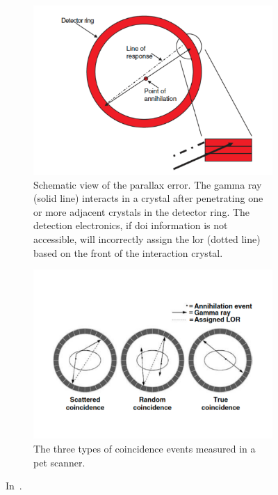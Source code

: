 \begin{figure}[!htbp]
\begin{subfigure}[t]{.49\textwidth}
\centering
\includegraphics[width=0.7\linewidth]{03_GraphicFiles/chapter1_Introduction/PET_parallax.pdf}
\caption{Schematic view of the parallax error. The gamma ray (solid line) interacts in a crystal after penetrating one or more adjacent crystals in the detector ring. The detection electronics, if \gls{doi} information is not accessible, will incorrectly assign the \gls{lor} (dotted line) based on the front of the interaction crystal.}
\label{chap2::fig::PET_parallax}
\end{subfigure}
\begin{subfigure}[t]{.49\textwidth}
\centering
\includegraphics[width=0.98\linewidth]{03_GraphicFiles/chapter1_Introduction/PET_events.pdf}
\caption{The three types of coincidence events measured in a \gls{pet} scanner.}
\label{chap2::fig::PET_events}
\end{subfigure}
\caption{In~\cite{Lewellen2004}.}
\label{chap2::fig::PET_details}
\end{figure} 

